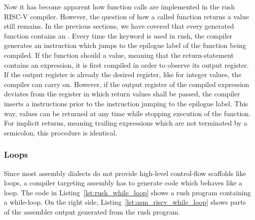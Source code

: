 Now it has become apparent how function calls are implemented in the rush RISC-V compiler.
However, the question of how a called function returns a value still remains.
In the previous sections, we have covered that every generated function contains an .
Every time the  keyword is used in rush, the compiler generates an instruction which jumps to the epilogue label of the function being compiled.
If the function should a value, meaning that the return-statement contains an expression,
it is first compiled in order to observe its output register.
If the output register is already the desired register, like  for integer values, the compiler can carry on.
However, if the output register of the compiled expression deviates from the register in which return values shall be passed,
the compiler inserts a  instructions prior to the instruction jumping to the epilogue label.
This way, values can be returned at any time while stopping execution of the function.
For implicit returns, meaning trailing expressions which are not terminated by a semicolon,
this procedure is identical.

\subsubsection{Loops}

Since most assembly dialects do not provide high-level control-flow scaffolds like loops,
a compiler targeting assembly has to generate code which behaves like a loop.
The code in Listing~\ref{lst:rush_while_loop} shows a rush program containing a while-loop.
On the right side, Listing~\ref{lst:asm_riscv_while_loop} shows parts of the assembler output generated from the rush program.

\begin{minipage}{.32\textwidth}
	\center
\end{minipage}%
\hspace{2.5cm}
\begin{minipage}{.47\textwidth}
	\center
\end{minipage}

